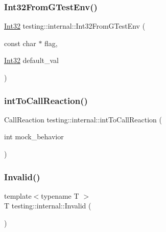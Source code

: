 \mbox{\label{namespacetesting_1_1internal_a0f7e728793f9e6cb0aa2b69eaa468bf3}} 
\subsubsection{\texorpdfstring{Int32FromGTestEnv()}{Int32FromGTestEnv()}}
{\footnotesize\ttfamily \mbox{\hyperlink{namespacetesting_1_1internal_af89e21e4043b5cf0c120af487b24fa06}{Int32}} testing\+::internal\+::\+Int32\+From\+G\+Test\+Env (\begin{DoxyParamCaption}\item[{const char $\ast$}]{flag,  }\item[{\mbox{\hyperlink{namespacetesting_1_1internal_af89e21e4043b5cf0c120af487b24fa06}{Int32}}}]{default\+\_\+val }\end{DoxyParamCaption})}

\mbox{\label{namespacetesting_1_1internal_a55ce2ee38c64db1a89feae3751439620}} 
\subsubsection{\texorpdfstring{intToCallReaction()}{intToCallReaction()}}
{\footnotesize\ttfamily Call\+Reaction testing\+::internal\+::int\+To\+Call\+Reaction (\begin{DoxyParamCaption}\item[{int}]{mock\+\_\+behavior }\end{DoxyParamCaption})}

\mbox{\label{namespacetesting_1_1internal_a3316c24e8a79f5def3e85d763ae50854}} 
\subsubsection{\texorpdfstring{Invalid()}{Invalid()}}
{\footnotesize\ttfamily template$<$typename T $>$ \\
T testing\+::internal\+::\+Invalid (\begin{DoxyParamCaption}{ }\end{DoxyParamCaption})\hspace{0.3cm}{\ttfamily [inline]}}

